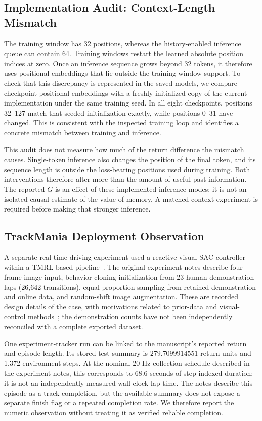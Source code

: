 \documentclass[runningheads]{llncs}
\begin{document}
\subsection{Implementation Audit: Context-Length Mismatch}
The training window has 32 positions, whereas the history-enabled inference queue can contain 64. Training windows restart the learned absolute position indices at zero. Once an inference sequence grows beyond 32 tokens, it therefore uses positional embeddings that lie outside the training-window support. To check that this discrepancy is represented in the saved models, we compare checkpoint positional embeddings with a freshly initialized copy of the current implementation under the same training seed. In all eight checkpoints, positions 32--127 match that seeded initialization exactly, while positions 0--31 have changed. This is consistent with the inspected training loop and identifies a concrete mismatch between training and inference.

This audit does not measure how much of the return difference the mismatch causes. Single-token inference also changes the position of the final token, and its sequence length is outside the loss-bearing positions used during training. Both interventions therefore alter more than the amount of useful past information. The reported $G$ is an effect of these implemented inference modes; it is not an isolated causal estimate of the value of memory. A matched-context experiment is required before making that stronger inference.

\subsection{TrackMania Deployment Observation}
A separate real-time driving experiment used a reactive visual SAC controller within a TMRL-based pipeline~\cite{tmrl}. The original experiment notes describe four-frame image input, behavior-cloning initialization from 23 human demonstration laps (26,642 transitions), equal-proportion sampling from retained demonstration and online data, and random-shift image augmentation. These are recorded design details of the case, with motivations related to prior-data and visual-control methods~\cite{rlpd,drqv2}; the demonstration counts have not been independently reconciled with a complete exported dataset.

One experiment-tracker run can be linked to the manuscript's reported return and episode length. Its stored test summary is $279.7099914551$ return units and 1,372 environment steps. At the nominal 20 Hz collection schedule described in the experiment notes, this corresponds to 68.6 seconds of step-indexed duration; it is not an independently measured wall-clock lap time. The notes describe this episode as a track completion, but the available summary does not expose a separate finish flag or a repeated completion rate. We therefore report the numeric observation without treating it as verified reliable completion.
\end{document}
